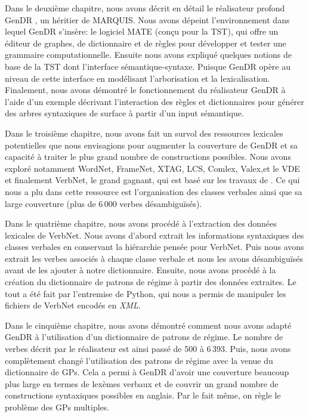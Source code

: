 Dans le deuxième chapitre, nous avons décrit en détail le réalisateur profond GenDR \citep{lareau18}, un héritier de MARQUIS. Nous avons dépeint l'environnement dans lequel GenDR s'insère: le logiciel MATE (conçu pour la TST), qui offre un éditeur de graphes, de dictionnaire et de règles pour développer et tester une grammaire computationnelle. Ensuite nous avons expliqué quelques notions de base de la \ac{TST} dont l'interface sémantique-syntaxe. Puisque GenDR opère au niveau de cette interface en modélisant l'arborisation et la lexicalisation. Finalement, nous avons démontré le fonctionnement du réalisateur GenDR à l'aide d'un exemple décrivant l'interaction des règles et dictionnaires pour générer des arbres syntaxiques de surface à partir d'un input sémantique.

Dans le troisième chapitre, nous avons fait un survol des ressources lexicales potentielles que nous envisagions pour augmenter la couverture de GenDR et sa capacité à traiter le plus grand nombre de constructions possibles. Nous avons exploré notamment WordNet, FrameNet, XTAG, LCS, Comlex, Valex,et le VDE et finalement VerbNet, le grand gagnant, qui est basé sur les travaux de \cite{verb-classes.levin.1993}. Ce qui nous a plu dans cette ressource est l'organisation des classes verbales ainsi que sa large couverture (plus de 6\,000 verbes désambiguïsés).

Dans le quatrième chapitre, nous avons procédé à l'extraction des données lexicales de VerbNet. Nous avons d'abord extrait les informations syntaxiques des classes verbales en conservant la hiérarchie pensée pour VerbNet. Puis nous avons extrait les verbes associés à chaque classe verbale et nous les avons désambiguïsés avant de les ajouter à notre dictionnaire. Ensuite, nous avons procédé à la création du dictionnaire de patrons de régime à partir des données extraites. Le tout a été fait par l'entremise de Python, qui nous a permis de manipuler les fichiers de VerbNet encodés en \emph{XML}.

Dans le cinquième chapitre, nous avons démontré comment nous avons adapté GenDR à l'utilisation d'un dictionnaire de patrons de régime. Le nombre de verbes décrit par le réalisateur est ainsi passé de 500 à 6\,393. Puis, nous avons complètement changé l'utilisation des patrons de régime avec la venue du dictionnaire de \acp{GP}. Cela a permi à GenDR d'avoir une couverture beaucoup plus large en termes de lexèmes verbaux et de couvrir un grand nombre de constructions syntaxiques possibles en anglais. Par le fait même, on règle le problème des \acp{GP} multiples.
	
